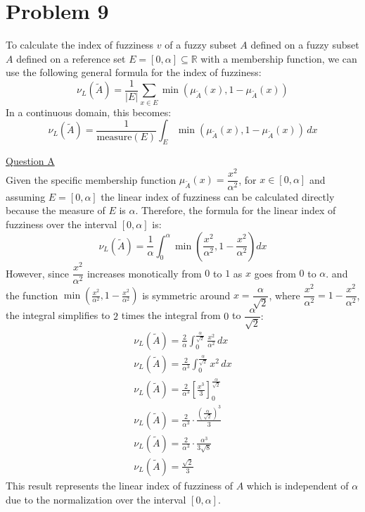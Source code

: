 \section{Problem 9}
To calculate the index of fuzziness $v$ of a fuzzy subset $A$ defined on a fuzzy subset $A$ defined on a reference set $E = [0, \alpha] \subseteq \mathbb{R}$ with a membership function, we can use the following general formula for the index of fuzziness:
\begin{equation}
	\nu_L(\tilde{A}) = \frac{1}{|E|} \sum_{x \in E} \min(\mu_{\tilde{A}}(x), 1 - \mu_{\tilde{A}}(x))
\end{equation}
In a continuous domain, this becomes:
\begin{equation}
	\nu_L(\tilde{A}) = \frac{1}{\text{measure}(E)} \int_{E} \min(\mu_{\tilde{A}}(x), 1 - \mu_{\tilde{A}}(x)) \, dx
\end{equation}

\underline{Question A}\\
Given the specific membership function $\mu_{\tilde{A}}(x) = \dfrac{x^2}{\alpha^2}$, for $x \in [0, \alpha]$ and assuming $E = [0, \alpha]$ the linear index of fuzziness can be calculated directly because the measure of $E$ is $α$. Therefore, the formula for the linear index of fuzziness over the interval 
$[0,α]$ is:
\begin{equation}
	\nu_L(\tilde{A}) = \dfrac{1}{\alpha} \int_{0}^{\alpha} \min\left( \dfrac{x^2}{\alpha^2}, 1 - \dfrac{x^2}{\alpha^2} \right) dx
\end{equation}
However, since $\dfrac{x^2}{\alpha^2}$ increases monotically from $0$ to $1$ as $x$ goes from $0$ to $\alpha$. and the function $\min\left(\frac{x^2}{\alpha^2}, 1 - \frac{x^2}{\alpha^2}\right)
$ is symmetric around $x = \dfrac{\alpha}{\sqrt{2}}$, where $\dfrac{x^2}{\alpha^2} = 1 - \dfrac{x^2}{\alpha^2}$, the integral simplifies to $2$ times the integral from $0$ to $\dfrac{\alpha}{\sqrt{2}}:$
\\
\begin{gather}
	\nu_L(\tilde{A}) = \frac{2}{\alpha} \int_{0}^{\frac{\alpha}{\sqrt{2}}} \frac{x^2}{\alpha^2} \, dx \\
	\nu_L(\tilde{A}) = \frac{2}{\alpha^3} \int_{0}^{\frac{\alpha}{\sqrt{2}}} x^2 \, dx\\
	\nu_L(\tilde{A}) = \frac{2}{\alpha^3} \left[ \frac{x^3}{3} \right]_{0}^{\frac{\alpha}{\sqrt{2}}} \\
	\nu_L(\tilde{A}) = \frac{2}{\alpha^3} \cdot \frac{\left(\frac{\alpha}{\sqrt{2}}\right)^3}{3}\\
	\nu_L(\tilde{A}) = \frac{2}{\alpha^3} \cdot \frac{\alpha^3}{3\sqrt{8}} \\
	\nu_L(\tilde{A}) = \frac{\sqrt{2}}{3}
\end{gather}
This result represents the linear index of fuzziness of $A$ which is independent of $\alpha$ due to the normalization over the interval $[0,\alpha]$.


